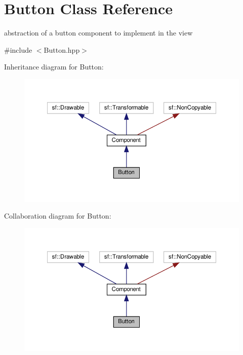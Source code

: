 \hypertarget{classButton}{}\section{Button Class Reference}
\label{classButton}


abstraction of a button component to implement in the view  




{\ttfamily \#include $<$Button.\+hpp$>$}



Inheritance diagram for Button\+:
\nopagebreak
\begin{figure}[H]
\begin{center}
\leavevmode
\includegraphics[width=350pt]{classButton__inherit__graph}
\end{center}
\end{figure}


Collaboration diagram for Button\+:
\nopagebreak
\begin{figure}[H]
\begin{center}
\leavevmode
\includegraphics[width=350pt]{classButton__coll__graph}
\end{center}
\end{figure}
